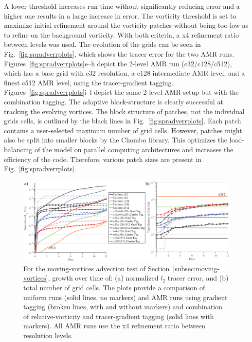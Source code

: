 A lower threshold increases run time without significantly 
reducing error and a higher one results in a large increase in error. 
The vorticity threshold is set to maximize initial refinement around 
the vorticity patches without being 
too low as to refine on the background vorticity.
With both criteria, a x4 refinement ratio between
levels was used.  The evolution of the grids can be seen in
Fig.~\ref{fig:spradverrplots}, which shows the tracer error for the two AMR
runs. 
Figures~\ref{fig:spradverrplots}e--h depict the 2-level AMR run (c32/c128/c512),
which has a base grid with c32 resolution, a c128 intermediate AMR
level, and a finest c512 AMR level, using the tracer-gradient tagging.
Figures~\ref{fig:spradverrplots}i--l depict the same 2-level AMR setup but with
the combination tagging.  The adaptive block-structure is clearly
successful at tracking the evolving vortices.  The block structure of
patches, not the individual grids cells, is outlined by the black lines
in Fig.~\ref{fig:spradverrplots}.  Each patch contains a user-selected maximum
number of grid cells.  However, patches might also be split into smaller
blocks by the Chombo library.  This optimizes the load-balancing of the
model on parallel computing architectures and increases the efficiency of
the code.  Therefore, various patch sizes are present in
Fig.~\ref{fig:spradverrplots}.
%
\begin{figure}
    \centerline{%
    \noindent
    \includegraphics[width=\textwidth]{Chap1/final_sprl_adv_err_grid_plots_w16.eps}}
    \caption{
For the moving-vortices advection test of
Section~\ref{subsec:moving-vortices},
growth over time of:
(a) normalized $l_2$ tracer error, and (b)
    total number of grid cells.  The plots
    provide a comparison of uniform runs (solid lines, no markers) and
    AMR runs using gradient tagging (broken lines, with and without
    markers) and combination of relative-vorticity and tracer-gradient
    tagging (solid lines with markers).  All AMR runs use the x4
    refinement ratio between resolution levels.}%
    \label{fig:spradvl2err}
\end{figure}
